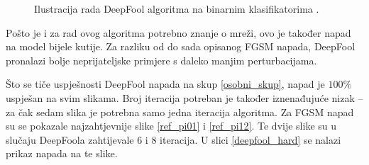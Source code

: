 \documentclass[utf8, diplomski]{fer}
\begin{document}
\begin{figure}[H]
  \centering
  \hfill
  \caption{Ilustracija rada DeepFool algoritma na binarnim klasifikatorima \citep{MoosaviDezfooli2016DeepFoolAS}.}
\end{figure}\label{fig:deepfool_illustrations}

Pošto je i za rad ovog algoritma potrebno znanje o mreži, ovo je također napad na model bijele kutije. Za razliku od do sada opisanog FGSM napada, DeepFool pronalazi bolje neprijateljske primjere s daleko manjim perturbacijama. \par
Što se tiče uspješnosti DeepFool napada na skup \ref{osobni_skup}, napad je $100\%$ uspješan na svim slikama. Broj iteracija potreban je također iznenađujuće nizak -- za čak sedam slika je potrebna samo jedna iteracija algoritma. Za FGSM napad su se pokazale najzahtjevnije slike \ref{ref_pi01} i \ref{ref_pi12}. Te dvije slike su u slučaju DeepFoola zahtijevale 6 i 8 iteracija. U slici \ref{deepfool_hard} se nalazi prikaz napada na te slike. 
\end{document}
